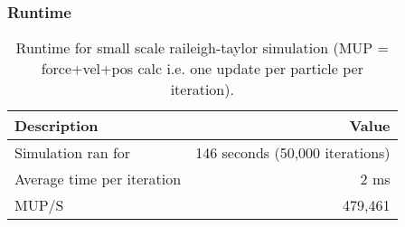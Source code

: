 \begin{frame}
    \frametitle{Runtime}
    \begin{table}[h!]
        \centering
        \begin{tabular}{|l|r|}
            \hline
            \textbf{Description} & \textbf{Value} \\ \hline
            Simulation ran for & 146 seconds (50,000 iterations) \\ \hline
            Average time per iteration & 2 ms \\ \hline
            MUP/S & 479,461 \\ \hline
        \end{tabular}
        \caption{Runtime for small scale raileigh-taylor simulation (MUP = force+vel+pos calc i.e. one update per particle per iteration).}
        \label{table:small_raileigh}
    \end{table}
\end{frame}